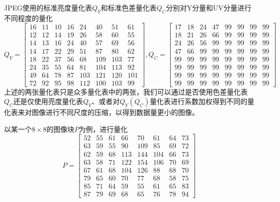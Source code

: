 JPEG使用的标准亮度量化表$Q_Y$和标准色差量化表$Q_C$分别对Y分量和UV分量进行不同程度的量化
\begin{equation}
    Q_Y=\begin{bmatrix}
        16 & 11 & 10 & 16 & 24 & 40 & 51 & 61 \\
        12 & 12 & 14 & 19 & 26 & 58 & 60 & 55 \\
        14 & 13 & 16 & 24 & 40 & 57 & 69 & 56 \\
        14 & 17 & 22 & 29 & 51 & 87 & 80 & 62 \\
        18 & 22 & 37 & 56 & 68 & 109 & 103 & 77 \\
        24 & 35 & 55 & 64 & 81 & 104 & 113 & 92 \\
        49 & 64 & 78 & 87 & 103 & 121 & 120 & 101 \\
        72 & 92 & 95 & 98 & 112 & 100 & 103 & 99
    \end{bmatrix},
    Q_C=\begin{bmatrix}
        17 & 18 & 24 & 47 & 99 & 99 & 99 & 99 \\
        18 & 21 & 26 & 66 & 99 & 99 & 99 & 99 \\
        24 & 26 & 56 & 99 & 99 & 99 & 99 & 99 \\
        47 & 66 & 99 & 99 & 99 & 99 & 99 & 99 \\
        99 & 99 & 99 & 99 & 99 & 99 & 99 & 99 \\
        99 & 99 & 99 & 99 & 99 & 99 & 99 & 99 \\
        99 & 99 & 99 & 99 & 99 & 99 & 99 & 99 \\
        99 & 99 & 99 & 99 & 99 & 99 & 99 & 99
    \end{bmatrix}
\end{equation}
上述的两张量化表只是众多量化表中的两张，我们可以通过是否使用色差量化表$Q_C$还是仅使用亮度量化表$Q_Y$、或者对$Q_Y(Q_C)$量化表进行系数加权得到不同的量化表来对图像进行不同尺度的压缩，以得到数据量更小的图像。

以某一个$8\times 8$的图像块$P$为例，进行量化
\begin{equation}
    P=\begin{bmatrix}
        52 & 55 & 61 & 66 & 70 & 61 & 64 & 73 \\
        63 & 59 & 55 & 90 & 109 & 85 & 69 & 72 \\
        62 & 59 & 68 & 113 & 144 & 104 & 66 & 73 \\
        63 & 58 & 71 & 122 & 154 & 106 & 70 & 69 \\
        67 & 61 & 68 & 104 & 126 & 88 & 68 & 70 \\
        79 & 65 & 60 & 70 & 77 & 68 & 58 & 75 \\
        85 & 71 & 64 & 59 & 55 & 61 & 65 & 83 \\
        87 & 79 & 69 & 68 & 65 & 76 & 78 & 94
        \end{bmatrix}
\end{equation}


